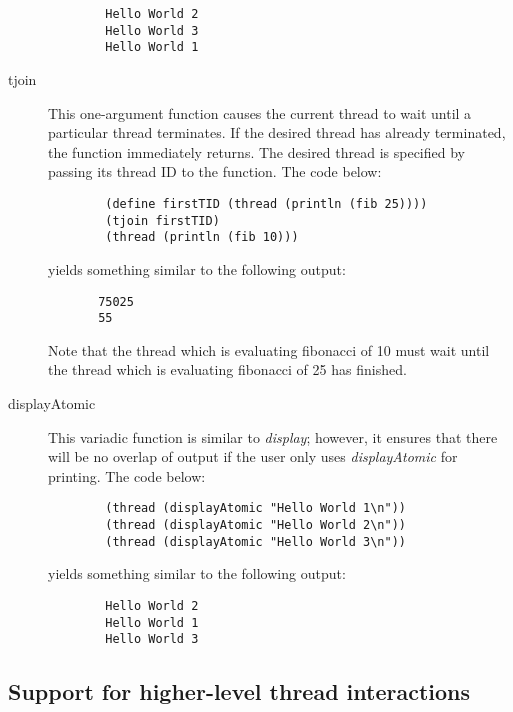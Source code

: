 \begin{description}
    \begin{verbatim}
        Hello World 2
        Hello World 3
        Hello World 1
    \end{verbatim} 

\item[tjoin] This one-argument function causes the current thread to wait until
a particular thread terminates. If the desired thread has already terminated,
the function immediately returns. The desired thread is specified by passing
its thread ID to the function.  The code below:

    \begin{verbatim}
        (define firstTID (thread (println (fib 25))))
        (tjoin firstTID)
        (thread (println (fib 10)))
    \end{verbatim} 

    yields something similar to the following output:

    \begin{verbatim}
       75025
       55
    \end{verbatim} 

    Note that the thread which is evaluating fibonacci of 10 must wait until the thread which is evaluating fibonacci of 25 has finished.

\item[displayAtomic] This variadic function is similar to {\it display}; however, it ensures that there will be no overlap of output if the user only uses {\it displayAtomic} for printing.
The code below:

    \begin{verbatim}
        (thread (displayAtomic "Hello World 1\n"))
        (thread (displayAtomic "Hello World 2\n"))
        (thread (displayAtomic "Hello World 3\n"))
    \end{verbatim} 

    yields something similar to the following output:

    \begin{verbatim}
        Hello World 2
        Hello World 1
        Hello World 3
    \end{verbatim} 

\end{description}

\subsection{Support for higher-level thread interactions}

